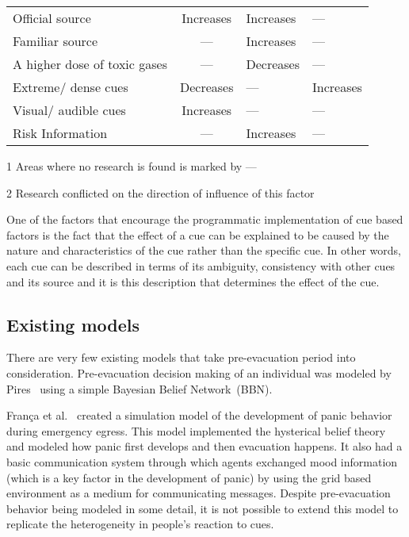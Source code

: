 \begin{table}[htbp]
\begin{threeparttable}[b]
\begin{tabular}{m{6.3cm} c >{\centering\arraybackslash}m{2.8cm} >{\centering\arraybackslash}m{2.8cm}}
Official source & Increases & Increases &---\\
Familiar source & --- & Increases &--- \\
A higher dose of toxic gases & --- & Decreases & --- \\
Extreme/ dense cues & Decreases & --- & Increases \\
Visual/ audible cues & Increases & --- & --- \\
Risk Information & --- & Increases & --- \\
\bottomrule
\end{tabular}
\begin{tablenotes}
\item[1]{Areas where no research is found is marked by ---}
\item[2]{Research conflicted on the direction of influence of this factor}
\end{tablenotes}
\label{tab:Cues}
\end{threeparttable}
\end{table}



One of the factors that encourage the programmatic implementation of cue based factors is the fact that the effect of a cue can be explained to be caused by the nature and characteristics of the cue rather than the specific cue. In other words, each cue can be described in terms of its ambiguity, consistency with other cues and its source and it is this description that determines the effect of the cue.


\subsection{Existing models}
\label{PreEvac:ExistingModels}

There are very few existing models that take pre-evacuation period into consideration. Pre-evacuation decision making of an individual was modeled by Pires~\cite{Pires:2005gs} using a simple Bayesian Belief Network~(BBN).

Fran{\c c}a et al.~\cite{Franca:2009wq} created a simulation model of the development of panic behavior during emergency egress. This model implemented the hysterical belief theory~\cite{Torres:2010tj} and modeled how panic first develops and then evacuation happens. It also had a basic communication system through which agents exchanged mood information (which is a key factor in the development of panic) by using the grid based environment as a medium for communicating messages. Despite pre-evacuation behavior being modeled in some detail, it is not possible to extend this model to replicate the heterogeneity in people's reaction to cues.

